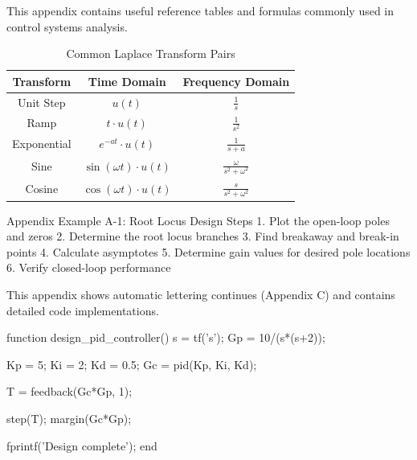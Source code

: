 \documentclass{../homework}
\begin{document}
This appendix contains useful reference tables and formulas commonly used in control systems analysis.

\begin{table}[h]
\centering
\begin{tabular}{|c|c|c|}
\hline
\textbf{Transform} & \textbf{Time Domain} & \textbf{Frequency Domain} \\
\hline
Unit Step & $u(t)$ & $\frac{1}{s}$ \\
Ramp & $t \cdot u(t)$ & $\frac{1}{s^2}$ \\
Exponential & $e^{-at} \cdot u(t)$ & $\frac{1}{s+a}$ \\
Sine & $\sin(\omega t) \cdot u(t)$ & $\frac{\omega}{s^2 + \omega^2}$ \\
Cosine & $\cos(\omega t) \cdot u(t)$ & $\frac{s}{s^2 + \omega^2}$ \\
\hline
\end{tabular}
\caption{Common Laplace Transform Pairs}
\end{table}

\begin{example}{Appendix Example A-1: Root Locus Design Steps}
1. Plot the open-loop poles and zeros
2. Determine the root locus branches
3. Find breakaway and break-in points
4. Calculate asymptotes
5. Determine gain values for desired pole locations
6. Verify closed-loop performance
\end{example}

This appendix shows automatic lettering continues (Appendix C) and contains detailed code implementations.

\begin{matlab}
function design_pid_controller()
    s = tf('s');
    Gp = 10/(s*(s+2));
    
    Kp = 5; Ki = 2; Kd = 0.5;
    Gc = pid(Kp, Ki, Kd);
    
    T = feedback(Gc*Gp, 1);
    
    step(T);
    margin(Gc*Gp);
    
    fprintf('Design complete\n');
end
\end{matlab}

\end{document}
